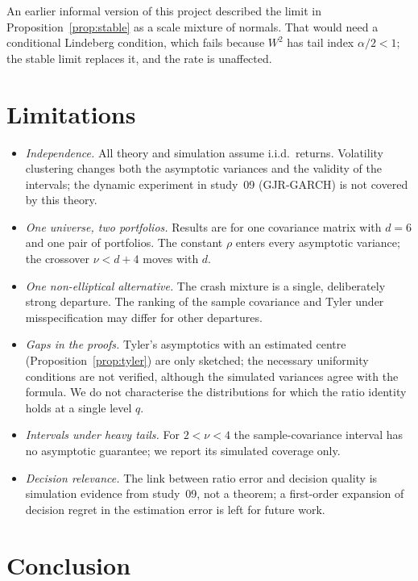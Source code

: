\documentclass[11pt]{article}
\theoremstyle{remark}
\begin{document}
An earlier informal version of this project described the limit in Proposition~\ref{prop:stable} as a scale
mixture of normals. That would need a conditional Lindeberg condition, which fails because $W^2$ has tail index
$\alpha/2<1$; the stable limit replaces it, and the rate is unaffected.

\section{Limitations}

\begin{itemize}
\item \emph{Independence.} All theory and simulation assume i.i.d.\ returns. Volatility clustering changes both
the asymptotic variances and the validity of the intervals; the dynamic experiment in study~09 (GJR-GARCH) is
not covered by this theory.
\item \emph{One universe, two portfolios.} Results are for one covariance matrix with $d=6$ and one pair of
portfolios. The constant $\rho$ enters every asymptotic variance; the crossover $\nu<d+4$ moves with $d$.
\item \emph{One non-elliptical alternative.} The crash mixture is a single, deliberately strong departure. The
ranking of the sample covariance and Tyler under misspecification may differ for other departures.
\item \emph{Gaps in the proofs.} Tyler's asymptotics with an estimated centre (Proposition~\ref{prop:tyler}) are
only sketched; the necessary uniformity conditions are not verified, although the simulated variances agree
with the formula. We do not characterise the distributions for which the ratio identity holds at a single
level $q$.
\item \emph{Intervals under heavy tails.} For $2<\nu<4$ the sample-covariance interval has no asymptotic
guarantee; we report its simulated coverage only.
\item \emph{Decision relevance.} The link between ratio error and decision quality is simulation evidence from
study~09, not a theorem; a first-order expansion of decision regret in the estimation error is left for future
work.
\end{itemize}

\section{Conclusion}
\end{document}
